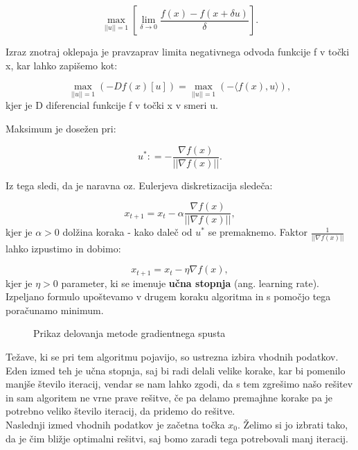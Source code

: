 \documentclass{article}
\begin{document}
\[\max_{||u||=1} \left [\lim_{\delta \to 0} \frac{f(x)-f(x+\delta u)}{\delta}\right].\]

\noindent Izraz znotraj oklepaja je pravzaprav limita negativnega odvoda funkcije f v točki x, kar lahko zapišemo kot:

\[\max_{||u||=1} \left (- Df(x)[u] \right) = \max_{||u||=1} \left (- \langle f(x) , u \rangle \right),\]
kjer je D diferencial funkcije f v točki x v smeri u.

\noindent Maksimum je dosežen pri:

\[ u^* : = - \frac{\nabla f(x)}{||\nabla f(x)||}.\]

\noindent Iz tega sledi, da je naravna oz. Eulerjeva diskretizacija sledeča:

\[ x_{t+1} = x_t - \alpha \frac{\nabla f(x)}{||\nabla f(x)||},\]
kjer je $\alpha > 0$ dolžina koraka - kako daleč od $u^*$ se premaknemo. Faktor $\frac{1}{||\nabla f(x)||}$ lahko izpustimo in dobimo:

\[ x_{t+1} = x_t - \eta {\nabla f(x)},\]
kjer je $\eta > 0$ parameter, ki se imenuje \textbf{učna stopnja} (ang. learning rate).
Izpeljano formulo upoštevamo v drugem koraku algoritma in s pomočjo tega poračunamo minimum.

\begin{figure}[h]
\centering
{}
\caption{Prikaz delovanja metode gradientnega spusta}
\label{fig:foobar}
\end{figure}


\noindent Težave, ki se pri tem algoritmu pojavijo, so ustrezna izbira vhodnih podatkov. Eden izmed teh je učna stopnja, saj bi radi delali velike korake, kar bi pomenilo manjše število iteracij, vendar se nam lahko zgodi, da s tem zgrešimo našo rešitev in sam algoritem ne vrne prave rešitve, če pa delamo premajhne korake pa je potrebno veliko število iteracij, da pridemo do rešitve. \\
Naslednji izmed vhodnih podatkov je začetna točka $x_0$. Želimo si jo izbrati tako, da je čim bližje optimalni rešitvi, saj bomo zaradi tega potrebovali manj iteracij.
\end{document}
